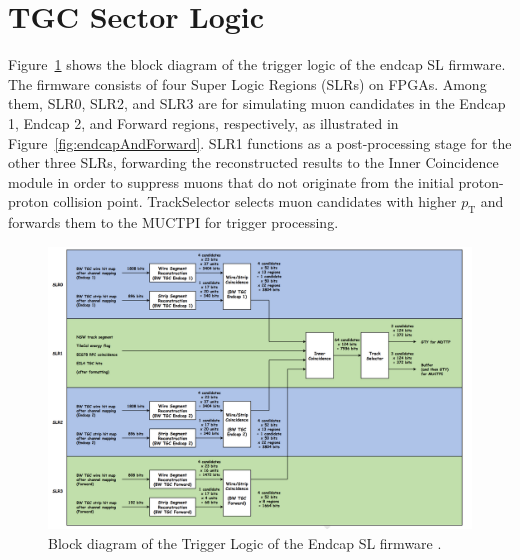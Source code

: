 \section{TGC Sector Logic} \label{sec:TGCSL}
Figure~\ref{fig:blockDiagram} shows the block diagram of the trigger logic of the endcap SL firmware. The firmware consists of four Super Logic Regions (SLRs) on FPGAs. Among them, SLR0, SLR2, and SLR3 are for simulating muon candidates in the Endcap 1, Endcap 2, and Forward regions, respectively, as illustrated in Figure~\ref{fig:endcapAndForward}. SLR1 functions as a post-processing stage for the other three SLRs, forwarding the reconstructed results to the Inner Coincidence module in order to suppress muons that do not originate from the initial proton-proton collision point.
TrackSelector selects muon candidates with higher $p_\mathrm{T}$ and forwards them to the MUCTPI for trigger processing.
\begin{figure}
  \centering
  \includegraphics[width=1.0\textwidth]{figs/chapter5/block_diagram_of_trigger_logic.png}
  \caption{Block diagram of the Trigger Logic of the Endcap SL firmware \cite{EndcapSLPDR}.}
  \label{fig:blockDiagram}
\end{figure}

